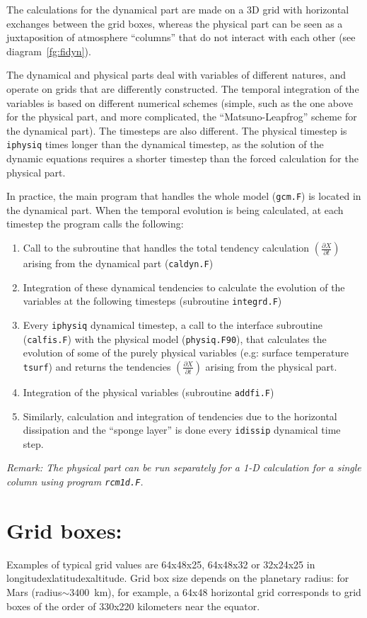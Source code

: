 The calculations for the dynamical part are made on a 3D grid
with horizontal exchanges between the grid boxes,
whereas the physical part can be seen as a juxtaposition of atmosphere
``columns'' that do not interact with each other (see diagram~\ref{fg:fidyn}).

The dynamical and physical parts deal with variables of different natures,
and operate on grids that are differently constructed.
The temporal integration of the variables is based
on different numerical schemes
(simple, such as the one above for the physical part,
and more complicated, the ``Matsuno-Leapfrog'' scheme for the dynamical part).
The timesteps are also different.
The physical timestep  is {\tt iphysiq} times longer than the dynamical
timestep, as the solution of the dynamic equations requires a shorter timestep
than the forced calculation for the physical part.

In practice, the main program that handles the whole model (\verb+gcm.F+)
is located in the dynamical part.
When the temporal evolution is being calculated,
at each timestep the program calls the following:
\begin{enumerate}
\item Call to the subroutine that handles the total tendency calculation
$(\frac{\partial X}{\partial t})$ arising from the dynamical part
(\verb+caldyn.F+)
\item Integration of these dynamical tendencies to calculate the evolution
of the variables at the following timesteps (subroutine \verb+integrd.F+)
\item Every {\tt iphysiq} dynamical timestep, a call to the interface
subroutine (\verb+calfis.F+) with the physical model (\verb+physiq.F90+),
that calculates the evolution of some of the purely physical variables
(e.g: surface temperature {\tt tsurf}) and returns the tendencies
$(\frac{\partial X}{\partial t})$
arising from the physical part.
\item Integration of the physical variables (subroutine \verb+addfi.F+)
\item Similarly, calculation and integration of tendencies due to
the horizontal dissipation and the ``sponge layer'' is done
every {\tt idissip} dynamical time step.
\end{enumerate}
{\em {Remark:} The physical part can be run separately for a 1-D calculation
for a single column using program \verb+rcm1d.F+.}


\section{Grid boxes:} Examples of typical grid values are 64x48x25,
64x48x32 or 32x24x25 in longitudexlatitudexaltitude. Grid box size depends
on the planetary radius: for Mars (radius$\sim$3400~km), for example, a 64x48 horizontal grid corresponds
to grid boxes of the order of 330x220 kilometers near the equator.


